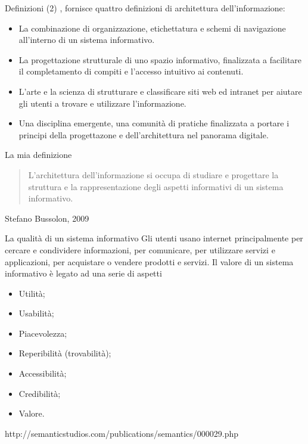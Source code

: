 \documentclass[pdf,mpa]{prosper}
\begin{document}
\begin{slide}{Definizioni (2)}
\cite{RosenfeldMorville1998}, fornisce quattro definizioni di architettura dell'informazione:
\begin{itemize}
\item La combinazione di organizzazione, etichettatura e schemi di navigazione all'interno di un sistema informativo.
\item La progettazione strutturale di uno spazio informativo, finalizzata a facilitare il completamento di compiti e l'accesso intuitivo ai contenuti.
\item L'arte e la scienza di strutturare e classificare siti web ed intranet per aiutare gli utenti a trovare e utilizzare l'informazione.
\item Una disciplina emergente, una comunità di pratiche finalizzata a portare i principi della progettazone e dell'architettura nel panorama digitale.
\end{itemize}

\end{slide}

\begin{slide}{La mia definizione}
\begin{quote}
L'architettura dell'informazione si occupa di studiare e progettare la struttura e la rappresentazione degli aspetti informativi di un sistema informativo.
\end{quote} 
Stefano Bussolon, 2009
\end{slide}

\begin{slide}{La qualità di un sistema informativo}
Gli utenti usano internet principalmente per cercare e condividere informazioni, per comunicare, per utilizzare servizi e applicazioni, per acquistare o vendere prodotti e servizi. Il valore di un sistema informativo è legato ad una serie di aspetti
\begin{itemize}
\item Utilità;
\item Usabilità;
\item Piacevolezza;
\item Reperibilità (trovabilità);
\item Accessibilità;
\item Credibilità;
\item Valore.
\end{itemize}

http://semanticstudios.com/publications/semantics/000029.php
\end{slide}
\end{document}
